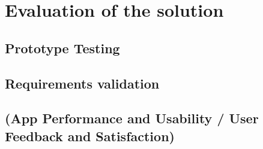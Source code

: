 \newpage\section{Evaluation of the solution}

\subsection{Prototype Testing}

\subsection{Requirements validation}

\subsection{(App Performance and Usability / User Feedback and Satisfaction)}
